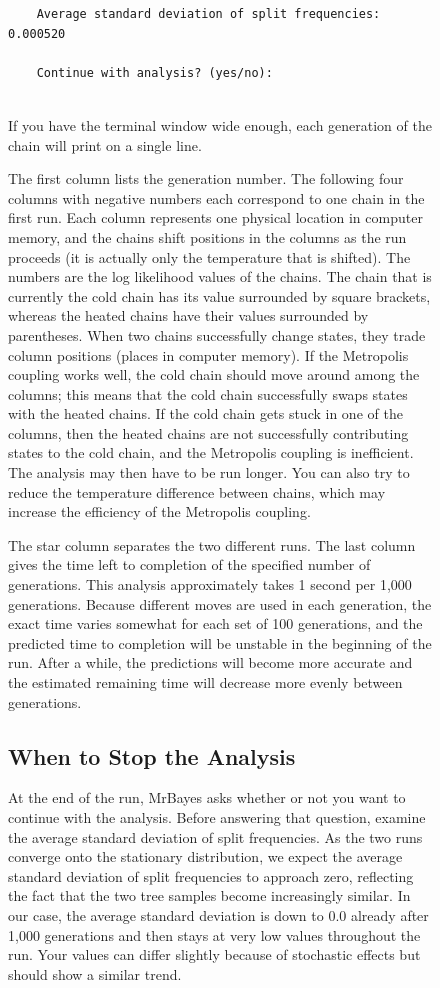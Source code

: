 \documentclass[12pt]{book}
\begin{document}
\begin{figure}[h]
\begin{singlespacing}
\begin{verbatim}
    Average standard deviation of split frequencies: 0.000520
 
    Continue with analysis? (yes/no): 
  
\end{verbatim}
\normalsize
\end{singlespacing}

If you have the terminal window wide enough, each generation of the chain will print on a single
line.

The first column lists the generation number. The following four columns with negative numbers each
correspond to one chain in the first run. Each column represents one physical location in computer
memory, and the chains shift positions in the columns as the run proceeds (it is actually only the
temperature that is shifted). The numbers are the log likelihood values of the chains. The chain
that is currently the cold chain has its value surrounded by square brackets, whereas the heated
chains have their values surrounded by parentheses. When two chains successfully change states,
they trade column positions (places in computer memory). If the Metropolis coupling works well, the
cold chain should move around among the columns; this means that the cold chain successfully swaps
states with the heated chains. If the cold chain gets stuck in one of the columns, then the heated
chains are not successfully contributing states to the cold chain, and the Metropolis coupling is
inefficient. The analysis may then have to be run longer. You can also try to reduce the
temperature difference between chains, which may increase the efficiency of the Metropolis
coupling.

The star column separates the two different runs. The last column gives the time left to completion
of the specified number of generations. This analysis approximately takes 1 second per 1,000
generations. Because different moves are used in each generation, the exact time varies somewhat
for each set of 100 generations, and the predicted time to completion will be unstable in the
beginning of the run. After a while, the predictions will become more accurate and the estimated
remaining time will decrease more evenly between generations.

\subsection{When to Stop the Analysis}

At the end of the run, MrBayes asks whether or not you want to continue with the analysis. Before
answering that question, examine the average standard deviation of split frequencies. As the two
runs converge onto the stationary distribution, we expect the average standard deviation of split
frequencies to approach zero, reflecting the fact that the two tree samples become increasingly
similar. In our case, the average standard deviation is down to 0.0 already after 1,000 generations
and then stays at very low values throughout the run. Your values can differ slightly because of
stochastic effects but should show a similar trend.


\end{figure}
\end{document}

